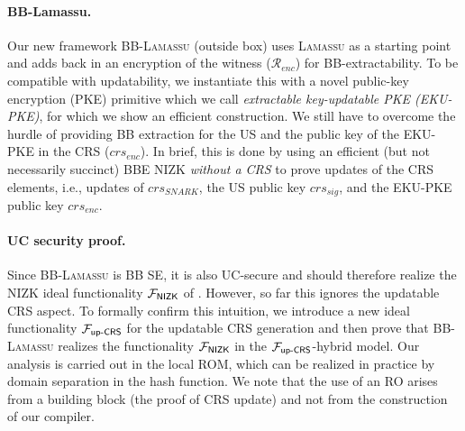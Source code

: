 \paragraph{BB-Lamassu.} Our new framework BB-\textsc{Lamassu} (outside box) uses \textsc{Lamassu} as a starting point and adds back in an encryption of the witness ($\mathcal{R}_{enc}$) for BB-extractability. To be compatible with updatability, we instantiate this with a novel public-key encryption (PKE) primitive which we call \emph{extractable key-updatable PKE (EKU-PKE)}, for which we show an efficient construction. 
We still have to overcome the hurdle of providing BB extraction for the US and the public key of the EKU-PKE in the CRS ($crs_{enc}$). In brief, this is done by using an efficient (but not necessarily succinct) BBE NIZK \emph{without a CRS} to prove updates of the CRS elements, i.e., updates of $crs_{SNARK}$, the US public key $crs_{sig}$, and the EKU-PKE public key $crs_{enc}$. 

\paragraph{UC security proof.}
Since BB-\textsc{Lamassu} is BB SE, it is also UC-secure and should therefore realize the NIZK ideal functionality $\mathcal{F}_{\mathsf{NIZK}}$ of \cite{AC:Groth06}. However, so far this ignores the updatable CRS aspect. 
To formally confirm this intuition, we introduce a new ideal functionality $\mathcal{F}_{\mathsf{up\text{-}CRS}}$ for the updatable CRS generation and then prove that BB-\textsc{Lamassu} realizes the functionality $\mathcal{F}_{\mathsf{NIZK}}$ in the $\mathcal{F}_{\mathsf{up\text{-}CRS}}$-hybrid model.
Our analysis is carried out in the local ROM, which can be realized in practice by domain separation in the hash function. We note that the use of an RO arises from a building block (the proof of CRS update) and not from the construction of our compiler. %

